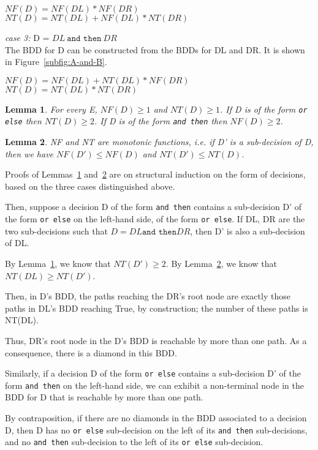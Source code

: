 \documentclass[a4paper,12pt,twoside]{article}
\renewcommand{\le}{\leqslant}
\renewcommand{\ge}{\geqslant}
\newcommand{\andthen}{\texttt{and then}}
\newcommand{\orelse}{\texttt{or else}}
\newtheorem{lemma}{Lemma}[subsection]
\begin{document}
$NF(D) = NF(DL) * NF(DR)$\\
$NT(D) = NT(DL) + NF(DL) * NT(DR)$

\emph{case 3:} D = $DL \ \andthen{} \ DR$\\
The BDD for D can be constructed from the BDDs for DL and DR. It is shown 
in Figure~\ref{subfig:A-and-B}.

$NF(D) = NF(DL) + NT(DL) * NF(DR)$\\
$NT(D) = NT(DL) * NT(DR)$

\begin{lemma}
\label{lemma:NF-NT-bound}
For every E, $NF(D) \ge 1$ and $NT(D) \ge 1$.
If D is of the form \orelse{} then $NT(D) \ge 2$.
If D is of the form \andthen{} then $NF(D) \ge 2$.
\end{lemma}

\begin{lemma}
\label{lemma:NF-NT-monotonic}
NF and NT are monotonic functions, i.e. if D' is a sub-decision of D,
then we have
        $NF(D') \le NF(D)$
and        
        $NT(D') \le NT(D)$.
\end{lemma}

Proofs of Lemmas~\ref{lemma:NF-NT-bound} and~\ref{lemma:NF-NT-monotonic} are on
structural induction on the form of decisions, based on the three cases
distinguished above.

Then, suppose a decision D of the form \andthen{} contains a
sub-decision D' of the form \orelse{} on the left-hand side, of the form
\orelse{}. If DL, DR are the two sub-decisions such that
$D = DL \andthen{} DR$, then D' is also a sub-decision of DL.

By Lemma~\ref{lemma:NF-NT-bound}, we know that $NT(D') \ge 2$. By
Lemma~\ref{lemma:NF-NT-monotonic}, we know that $NT(DL) \ge NT(D')$.

Then, in D's BDD, the paths reaching the DR's root node are exactly
those paths in DL's BDD reaching True, by construction; the number of
these paths is NT(DL).

Thus, DR's root node in the D's BDD is reachable by more than one
path. As a consequence, there is a diamond in this BDD.

Similarly, if a decision D of the form \orelse{} contains a
sub-decision D' of the form \andthen{} on the left-hand side, we can
exhibit a non-terminal node in the BDD for D that is reachable by more
than one path.

By contraposition, if there are no diamonds in the BDD associated to a
decision D, then D has no \orelse{} sub-decision on the left of its
\andthen{} sub-decisions, and no \andthen{} sub-decision to the left of
its \orelse{} sub-decision.
\end{document}
